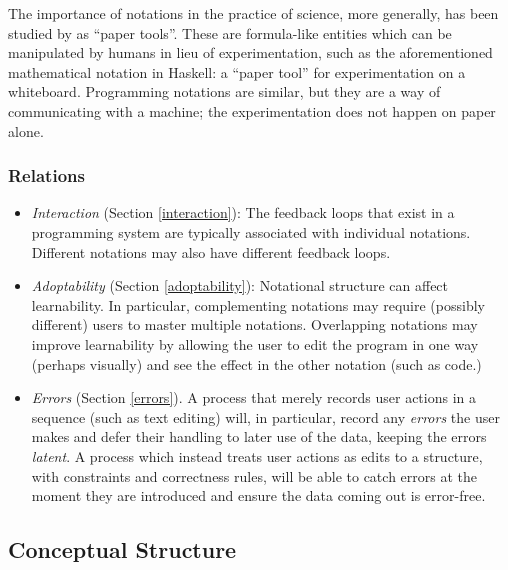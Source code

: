 \documentclass[english,submission]{programming}
\begin{document}
The importance of notations in the practice of science, more generally,
has been studied by \cite{PaperTools} as ``paper tools''. These are
formula-like entities which can be manipulated by humans in lieu of
experimentation, such as the aforementioned mathematical notation in
Haskell: a ``paper tool'' for experimentation on a whiteboard.
Programming notations are similar, but they are a way of communicating
with a machine; the experimentation does not happen on paper alone.

\hypertarget{relations-1}{%
\subsubsection{Relations}\label{relations-1}}

\begin{itemize}
\tightlist
\item
  \emph{Interaction} (Section \ref{interaction}): The feedback loops
  that exist in a programming system are typically associated with
  individual notations. Different notations may also have different
  feedback loops.
\item
  \emph{Adoptability} (Section \ref{adoptability}): Notational structure
  can affect learnability. In particular, complementing notations may
  require (possibly different) users to master multiple notations.
  Overlapping notations may improve learnability by allowing the user to
  edit the program in one way (perhaps visually) and see the effect in
  the other notation (such as code.)
\item
  \emph{Errors} (Section \ref{errors}). A process that merely records
  user actions in a sequence (such as text editing) will, in particular,
  record any \emph{errors} the user makes and defer their handling to
  later use of the data, keeping the errors \emph{latent}. A process
  which instead treats user actions as edits to a structure, with
  constraints and correctness rules, will be able to catch errors at the
  moment they are introduced and ensure the data coming out is
  error-free.
\end{itemize}

\hypertarget{conceptual-structure}{%
\subsection{Conceptual Structure}\label{conceptual-structure}}

\end{document}
